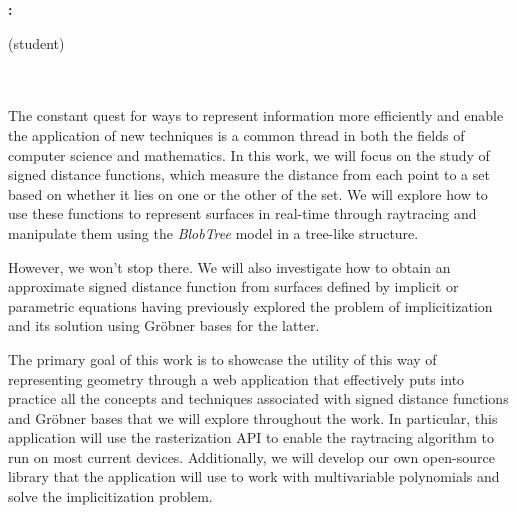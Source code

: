 \thispagestyle{empty}


\begin{center}
{\large\bfseries \miTitle: \miSubtitle}\\
\end{center}
\begin{center}
\miNombre (student)\\
\end{center}

\\

\vspace{0.7cm}
\\

The constant quest for ways to represent information more efficiently and enable the application of new techniques is a common thread in both the fields of computer science and mathematics. In this work, we will focus on the study of signed distance functions, which measure the distance from each point to a set based on whether it lies on one  or the other of the set. We will explore how to use these functions to represent surfaces in real-time through raytracing and manipulate them using the \textit{BlobTree} model in a tree-like structure.\newline

However, we won't stop there. We will also investigate how to obtain an approximate signed distance function from surfaces defined by implicit or parametric equations having previously explored the problem of implicitization and its solution using Gröbner bases for the latter.\newline

The primary goal of this work is to showcase the utility of this way of representing geometry through a web application that effectively puts into practice all the concepts and techniques associated with signed distance functions and Gröbner bases that we will explore throughout the work. In particular, this application will use the rasterization API to enable the raytracing algorithm to run on most current devices. Additionally, we will develop our own open-source library that the application will use to work with multivariable polynomials and solve the implicitization problem.


\thispagestyle{empty}
\cleardoublepage
\endinput
